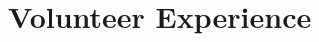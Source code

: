 \section{\textbf{Volunteer Experience}}
\vspace{-0.4mm}
\resumeSubHeadingListStart


%
%


\resumeSubHeadingListEnd
\vspace{-6mm}


